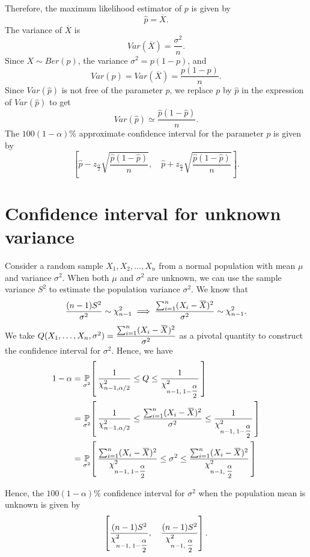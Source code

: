 Therefore, the maximum likelihood estimator of $p$ is given by
\[
    \widehat{p} = \overline{X}.
\]
The variance of $\overline{X}$ is
\[
    Var\left(\overline{X}\right) = \frac{\sigma^2}{n}.
\]
Since $X \sim Ber(p)$, the variance $\sigma^2 = p(1 - p)$, and
\[
    Var\left(\widehat{p}\right) = Var\left(\overline{X}\right) = \frac{p(1 - p)}{n}.
\]
Since $Var\left(\widehat{p}\right)$ is not free of the parameter $p$, we replace $p$ by $\widehat{p}$ in the expression of $Var\left(\widehat{p}\right)$ to get
\[
    Var\left(\widehat{p}\right) \simeq \frac{\widehat{p}(1 - \widehat{p})}{n}.
\]
The $100(1-\alpha)\%$ approximate confidence interval for the parameter $p$ is given by
\[
    \left[\widehat{p} - z_{\frac{\alpha}{2}} \sqrt{\frac{\widehat{p}(1 - \widehat{p})}{n}},\quad \widehat{p} + z_{\frac{\alpha}{2}} \sqrt{\frac{\widehat{p}(1 - \widehat{p})}{n}}\right].
\]

\section{Confidence interval for unknown variance}

Consider a random sample $X_1, X_2, \ldots, X_n$ from a normal population with mean $\mu$ and variance $\sigma^2$. 
When both $\mu$ and $\sigma^2$ are unknown, we can use the sample variance $S^2$ to estimate the population variance $\sigma^2$.
We know that 
\[
\frac{(n-1)S^2}{\sigma^2} \sim \chi^2_{n-1} \implies \frac{\sum^n_{i=1} (X_i - \ols{X})^2}{\sigma^2} \sim \chi^2_{n-1}. 
\]
We take $Q(X_1, \ldots, X_n, \sigma^2) = \displaystyle \frac{\sum^n_{i=1} (X_i - \ols{X})^2}{\sigma^2}$ as a pivotal quantity to construct
the confidence interval for $\sigma^2$. Hence, we have 
\begin{align*}
    1 - \alpha &= \uprob[\sigma^2]{\frac{1}{\chi^2_{n-1, \alpha / 2}} \leq Q \leq \frac{1}{\chi^2_{n-1,\> 1 - \mfrac{\alpha}{2} }} }\\
    &= \uprob[\sigma^2]{ \frac{1}{\chi^2_{n-1, \alpha / 2}} \leq \frac{\sum^n_{i=1} (X_i - \ols{X})^2}{\sigma^2} \leq \frac{1}{\chi^2_{n-1,\> 1 - \mfrac{\alpha}{2} }} }\\
    &= \uprob[\sigma^2]{ \frac{\sum^n_{i=1} (X_i - \ols{X})^2}{\chi^2_{n-1,\> 1 - \mfrac{\alpha}{2}}} \leq \sigma^2 \leq \frac{\sum^n_{i=1} (X_i - \ols{X})^2}{\chi^2_{n-1,\> \mfrac{\alpha}{2} }} }
\end{align*}

Hence, the $100(1 - \alpha)\%$ confidence interval for $\sigma^2$ when the population mean is unknown is given by 
\[
\left[ \frac{(n-1)S^2}{\chi^2_{n-1,\> 1 - \mfrac{\alpha}{2}}} ,\quad \frac{(n-1)S^2}{\chi^2_{n-1,\> \mfrac{\alpha}{2}}} \right].
\]

